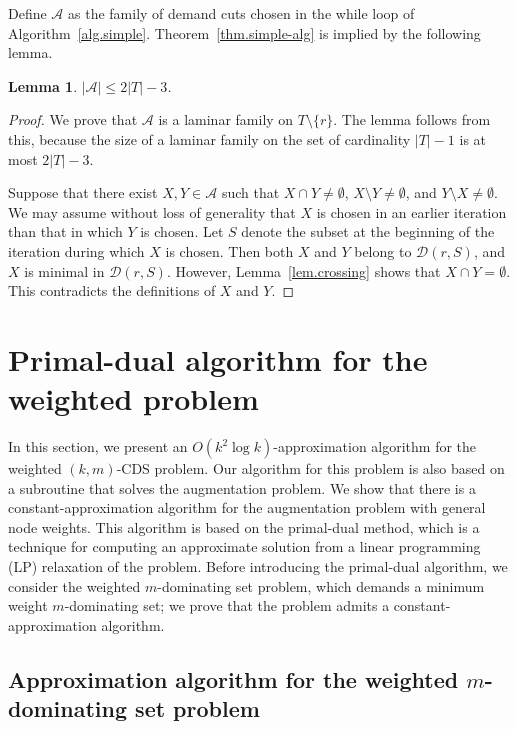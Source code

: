 \documentclass[11pt]{article}
\newcommand{\Afam}{\mathcal{A}}
\newcommand{\Dfam}{\mathcal{D}}
\newtheorem{lemma}{Lemma}
\begin{document}
Define $\Afam$ as the family of demand cuts
chosen in the while loop of Algorithm~\ref{alg.simple}.
Theorem~\ref{thm.simple-alg} is implied by the following lemma.

 \begin{lemma}
  \label{lem.laminarity}
 $|\Afam| \leq 2|T|-3$.
 \end{lemma}
 \begin{proof}
  We prove that $\Afam$ is a laminar family
  on $T \setminus \{r\}$.
  The lemma follows from this, because the size of a laminar family
  on the set of cardinality $|T|-1$ is at most $2|T|-3$.
  
Suppose that there exist $X,Y \in \Afam$ such that
 $X\cap Y \neq \emptyset$, $X \setminus Y \neq \emptyset$, and $Y
  \setminus X \neq \emptyset$.
  We may assume without loss of generality that
  $X$ is chosen in an earlier iteration than that in which $Y$ is chosen.
  Let $S$ denote the subset at the beginning of the iteration during which $X$ is chosen.
  Then
  both $X$ and $Y$ belong to $\Dfam(r,S)$,
  and $X$ is minimal in $\Dfam(r,S)$.
  However, Lemma~\ref{lem.crossing} shows that
  $X \cap Y = \emptyset$.
    This contradicts the definitions of $X$ and $Y$.
 \end{proof}

 

\section{Primal-dual algorithm for the weighted problem}
\label{sec.primal-dual}

In this section, we present an $O(k^2 \log k)$-approximation algorithm
for the weighted $(k,m)$-CDS problem.
Our algorithm for this problem is also based on a subroutine that
solves the augmentation problem. We show that there is a
constant-approximation algorithm for the augmentation problem with general
node weights.
This algorithm is based on the primal-dual method, which is a technique
for computing an approximate solution from a linear programming (LP) relaxation of the problem.
Before introducing the primal-dual algorithm, we consider the
weighted $m$-dominating set problem, which 
demands a minimum weight $m$-dominating set;
we prove that the problem admits a constant-approximation algorithm.

\subsection{Approximation algorithm for the weighted  $m$-dominating set problem}
\label{subs.dominating}
\end{document}
